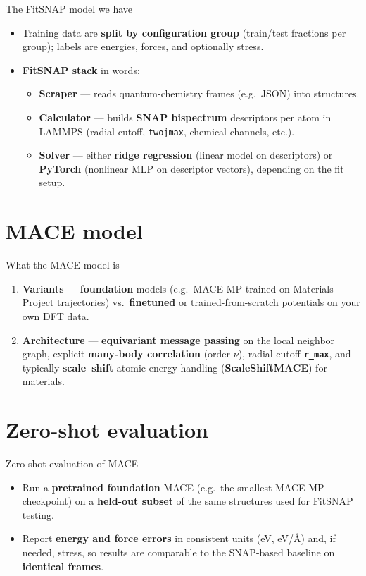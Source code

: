 \documentclass[aspectratio=169]{beamer}
\begin{document}
\begin{frame}{The FitSNAP model we have}
  \begin{itemize}
    \item Training data are \textbf{split by configuration group} (train/test fractions per group); labels are energies, forces, and optionally stress.
    \item \textbf{FitSNAP stack} in words:
      \begin{itemize}
        \item \textbf{Scraper} --- reads quantum-chemistry frames (e.g.\ JSON) into structures.
        \item \textbf{Calculator} --- builds \textbf{SNAP bispectrum} descriptors per atom in LAMMPS (radial cutoff, \texttt{twojmax}, chemical channels, etc.).
        \item \textbf{Solver} --- either \textbf{ridge regression} (linear model on descriptors) or \textbf{PyTorch} (nonlinear MLP on descriptor vectors), depending on the fit setup.
      \end{itemize}
  \end{itemize}
\end{frame}

\section{MACE model}

\begin{frame}{What the MACE model is}
  \begin{enumerate}
    \item \textbf{Variants} --- \textbf{foundation} models (e.g.\ MACE-MP trained on Materials Project trajectories) vs.\ \textbf{finetuned} or trained-from-scratch potentials on your own DFT data.
    \item \textbf{Architecture} --- \textbf{equivariant message passing} on the local neighbor graph, explicit \textbf{many-body correlation} (order $\nu$), radial cutoff \textbf{\texttt{r\_max}}, and typically \textbf{scale--shift} atomic energy handling (\textbf{ScaleShiftMACE}) for materials.
  \end{enumerate}
\end{frame}

\section{Zero-shot evaluation}

\begin{frame}{Zero-shot evaluation of MACE}
  \begin{itemize}
    \item Run a \textbf{pretrained foundation} MACE (e.g.\ the smallest MACE-MP checkpoint) on a \textbf{held-out subset} of the same structures used for FitSNAP testing.
    \item Report \textbf{energy and force errors} in consistent units (eV, eV/\AA) and, if needed, stress, so results are comparable to the SNAP-based baseline on \textbf{identical frames}.
  \end{itemize}
\end{frame}
\end{document}
